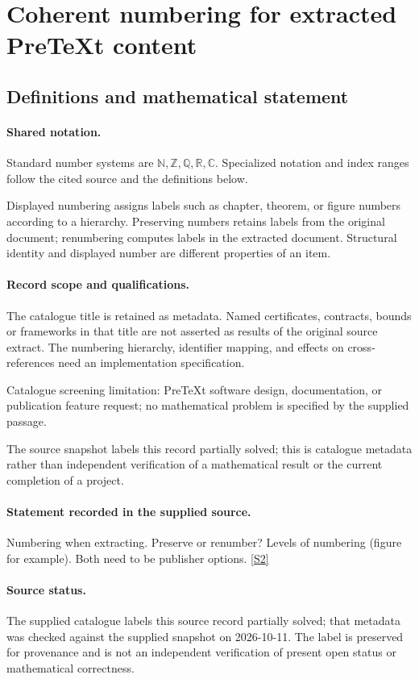 \documentclass[11pt]{article}
\newcommand{\sref}[2]{\hyperlink{source:#1:#2}{[S#2]}}
\begin{document}
\section{Coherent numbering for extracted PreTeXt content}\label{statement}

\subsection{Definitions and mathematical statement}

\paragraph{Shared notation.}Standard number systems are $\mathbb N,\mathbb Z,\mathbb Q,\mathbb R,\mathbb C$. Specialized notation and index ranges follow the cited source and the definitions below.


Displayed numbering assigns labels such as chapter, theorem, or figure numbers according to a hierarchy. Preserving numbers retains labels from the original document; renumbering computes labels in the extracted document. Structural identity and displayed number are different properties of an item.
\paragraph{Record scope and qualifications.}
The catalogue title is retained as metadata. Named certificates, contracts, bounds or frameworks in that title are not asserted as results of the original source extract.
The numbering hierarchy, identifier mapping, and effects on cross-references need an implementation specification.

Catalogue screening limitation: PreTeXt software design, documentation, or publication feature request; no mathematical problem is specified by the supplied passage.

The source snapshot labels this record partially solved; this is catalogue metadata rather than independent verification of a mathematical result or the current completion of a project.
\paragraph{Statement recorded in the supplied source.}
Numbering when extracting. Preserve or renumber? Levels of numbering (figure for example). Both need to be publisher options. \sref{statement}{2}
\paragraph{Source status.}
The supplied catalogue labels this source record partially solved; that metadata was checked against the supplied snapshot on 2026-10-11. The label is preserved for provenance and is not an independent verification of present open status or mathematical correctness.
\end{document}
